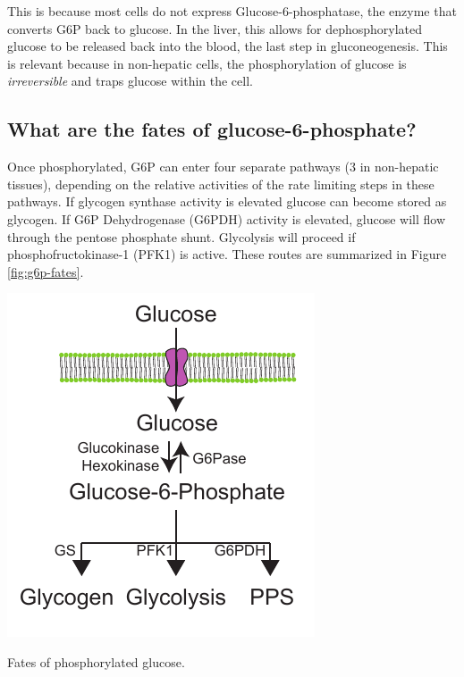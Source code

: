 \documentclass{tufte-handout}
\begin{document}
  This is because most cells do not express Glucose-6-phosphatase, the enzyme that converts G6P back to glucose.  In the liver, this allows for dephosphorylated glucose to be released back into the blood, the last step in gluconeogenesis.  This is relevant because in non-hepatic cells, the phosphorylation of glucose is \emph{irreversible} and traps glucose within the cell.

\subsection{What are the fates of glucose-6-phosphate?}

Once phosphorylated, G6P can enter four separate pathways (3 in non-hepatic tissues), depending on the relative activities of the rate limiting steps in these pathways.  If glycogen synthase activity is elevated glucose can become stored as glycogen.  If G6P Dehydrogenase (G6PDH) activity is elevated, glucose will flow through the pentose phosphate shunt.  Glycolysis will proceed if phosphofructokinase-1 (PFK1) is active.  These routes are summarized in Figure \ref{fig:g6p-fates}.

\begin{marginfigure}
\includegraphics{figures/g6p-fates.pdf}
\caption{Fates of phosphorylated glucose.}
\label{fig:g6p-fates}
\end{marginfigure}
\end{document}
